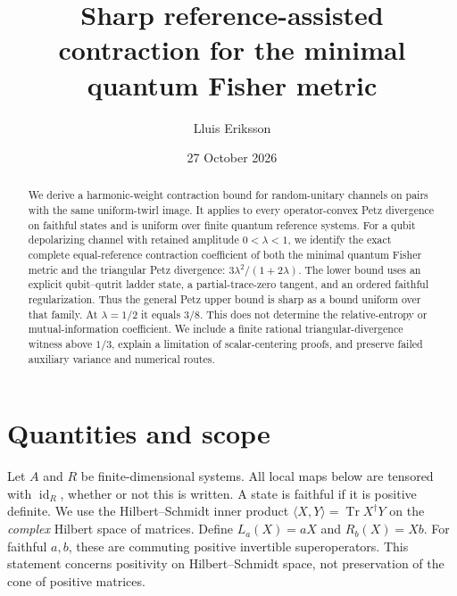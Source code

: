 \documentclass[11pt]{article}
\title{Sharp reference-assisted contraction for the minimal quantum Fisher metric}
\author{Lluis Eriksson}
\date{27 October 2026}
\newcommand{\Tr}{\operatorname{Tr}}
\newcommand{\id}{\operatorname{id}}
\newcommand{\ip}[2]{\langle #1,#2\rangle}
\theoremstyle{remark}
\begin{document}
\maketitle
\begin{abstract}
We derive a harmonic-weight contraction bound for random-unitary channels on pairs with the same uniform-twirl image. It applies to every operator-convex Petz divergence on faithful states and is uniform over finite quantum reference systems. For a qubit depolarizing channel with retained amplitude \(0<\lambda<1\), we identify the exact complete equal-reference contraction coefficient of both the minimal quantum Fisher metric and the triangular Petz divergence:
\(3\lambda^2/(1+2\lambda)\).
The lower bound uses an explicit qubit--qutrit ladder state, a partial-trace-zero tangent, and an ordered faithful regularization. Thus the general Petz upper bound is sharp as a bound uniform over that family. At \(\lambda=1/2\) it equals \(3/8\). This does not determine the relative-entropy or mutual-information coefficient. We include a finite rational triangular-divergence witness above \(1/3\), explain a limitation of scalar-centering proofs, and preserve failed auxiliary variance and numerical routes.
\end{abstract}

\section{Quantities and scope}
Let \(A\) and \(R\) be finite-dimensional systems. All local maps below are tensored with \(\id_R\), whether or not this is written. A state is faithful if it is positive definite. We use the Hilbert--Schmidt inner product
\(\ip{X}{Y}=\Tr X^\dagger Y\) on the \emph{complex} Hilbert space of matrices. Define
\(L_a(X)=aX\) and \(R_b(X)=Xb\).
For faithful \(a,b\), these are commuting positive invertible superoperators. This statement concerns positivity on Hilbert--Schmidt space, not preservation of the cone of positive matrices.
\end{document}

